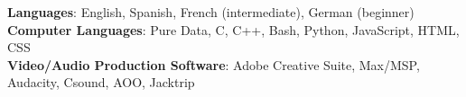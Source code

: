 \textbf{Languages}: English, Spanish, French (intermediate), German (beginner)
\\
\textbf{Computer Languages}: Pure Data, C, C++, Bash, Python, JavaScript, HTML, CSS
\\
\textbf{Video/Audio Production Software}: Adobe Creative Suite, Max/MSP, Audacity, Csound, AOO, Jacktrip